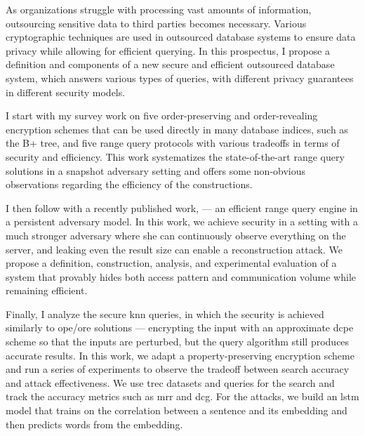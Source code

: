 As organizations struggle with processing vast amounts of information, outsourcing sensitive data to third parties becomes necessary.
Various cryptographic techniques are used in outsourced database systems to ensure data privacy while allowing for efficient querying.
In this prospectus, I propose a definition and components of a new secure and efficient outsourced database system, which answers various types of queries, with different privacy guarantees in different security models.

I start with my survey work on five order-preserving and order-revealing encryption schemes that can be used directly in many database indices, such as the B+ tree, and five range query protocols with various tradeoffs in terms of security and efficiency.
This work systematizes the state-of-the-art range query solutions in a snapshot adversary setting and offers some non-obvious observations regarding the efficiency of the constructions.

I then follow with a recently published work, \epsolute{} --- an efficient range query engine in a persistent adversary model.
In this work, we achieve security in a setting with a much stronger adversary where she can continuously observe everything on the server, and leaking even the result size can enable a reconstruction attack.
We propose a definition, construction, analysis, and experimental evaluation of a system that provably hides both access pattern and communication volume while remaining efficient.

Finally, I analyze the secure \acrlong{knn} queries, in which the security is achieved similarly to \acrshort{ope}/\acrshort{ore} solutions --- encrypting the input with an approximate \acrlong{dcpe} scheme so that the inputs are perturbed, but the query algorithm still produces accurate results.
In this work, we adapt a property-preserving encryption scheme and run a series of experiments to observe the tradeoff between search accuracy and attack effectiveness.
We use \acrshort{trec} datasets and queries for the search and track the accuracy metrics such as \acrshort{mrr} and \acrshort{dcg}.
For the attacks, we build an \acrshort{lstm} model that trains on the correlation between a sentence and its embedding and then predicts words from the embedding.
